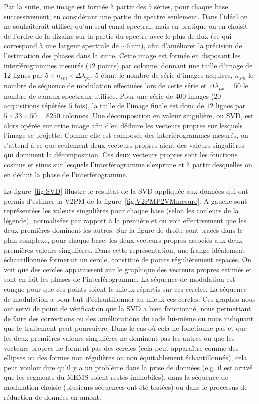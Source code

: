 Par la suite, une image est formée à partir des $5$ séries, pour chaque base successivement, en considérant une partie du spectre seulement. Dans l'idéal on ne souhaiterait utiliser qu'un seul canal spectral, mais en pratique on en choisit de l'ordre de la dizaine sur la partie du spectre avec le plus de flux (ce qui correspond à une largeur spectrale de $\sim 6\,$nm), afin d'améliorer la précision de l'estimation des phases dans la suite. Cette image est formée en disposant les interférogrammes mesurés ($12$ points) par colonne, donnant une taille d'image de $12$ lignes par $5 \times n_{sm} \times \Delta\lambda_{px}$, $5$ étant le nombre de série d'images acquises, $n_{sm}$ le nombre de séquence de modulation effectuées lors de cette série et $\Delta\lambda_{px} = 50$ le nombre de canaux spectraux utilisée. Pour une série de $400$ images ($20$ acquisitions répétées $5$ fois), la taille de l'image finale est donc de $12$ lignes par $5 \times 33 \times 50 = 8250$ colonnes. Une décomposition en valeur singulière, ou \ac{SVD}, est alors opérée sur cette image afin d'en déduire les vecteurs propres sur lesquels l'image se projette. Comme elle est composée des interférogrammes mesurés, on s'attend à ce que seulement deux vecteurs propres aient des valeurs singulières qui dominent la décomposition. Ces deux vecteurs propres sont les fonctions cosinus et sinus sur lesquels l'interférogramme s'exprime et à partir desquelles on en déduit la phase de l'interférogramme.

La figure~\ref{fig:SVD} illustre le résultat de la \ac{SVD} appliquée aux données qui ont permis d'estimer la \ac{V2PM} de la figure~\ref{fig:V2PMP2VMmesure}. A gauche sont représentées les valeurs singulières pour chaque base (selon les couleurs de la légende), normalisées par rapport à la première et on voit effectivement que les deux premières dominent les autres. Sur la figure de droite sont tracés dans le plan complexe, pour chaque base, les deux vecteurs propres associés aux deux premières valeurs singulières. Dans cette représentation, une frange idéalement échantillonnée formerait un cercle, constitué de points régulièrement espacés. On voit que des cercles apparaissent sur le graphique des vecteurs propres estimés et sont en fait les phases de l'interférogramme. La séquence de modulation est conçue pour que ces points soient le mieux répartis sur ces cercles. La séquence de modulation a pour but d'échantillonner au mieux ces cercles. Ces graphes nous ont servi de point de vérification que la \ac{SVD} a bien fonctionné, nous permettant de faire des corrections ou des améliorations du code lui-même ou nous indiquant que le traitement peut poursuivre. Dans le cas où cela ne fonctionne pas et que les deux premières valeurs singulières ne dominent pas les autres ou que les vecteurs propres ne forment pas des cercles (cela peut apparaître comme des ellipses ou des formes non régulières ou non équitablement échantillonnés), cela peut vouloir dire qu'il y a un problème dans la prise de données (e.g. il est arrivé que les segments du \ac{MEMS} soient restés immobiles), dans la séquence de modulation choisie (plusieurs séquences ont été testées) ou dans le processus de réduction de données en amont.

